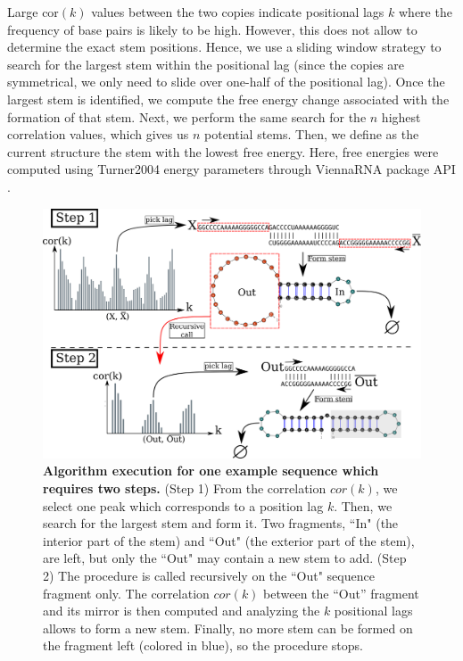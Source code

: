 Large \(\text{cor}(k)\) values between the two copies indicate positional lags \(k\) where the frequency of base pairs is likely to be high. However, this does not allow to determine the exact stem positions. Hence, we use a sliding window strategy to search for the largest stem within the positional lag (since the copies are symmetrical, we only need to slide over one-half of the positional lag). Once the largest stem is identified, we compute the free energy change associated with the formation of that stem. Next, we perform the same search for the \(n\) highest correlation values, which gives us \(n\) potential stems. Then, we define as the current structure the stem with the lowest free energy. Here, free energies were computed using Turner2004 energy parameters through ViennaRNA package API \cite{lorenz11_vienn_packag}.


\begin{figure}[t!]
	\centering
	\includegraphics[width=1.\linewidth]{../res/images/rafft/algo_draw.png}
	\caption{\label{algo_desc}\textbf{Algorithm execution for one example sequence which requires two steps.} (Step 1) From the correlation $cor(k)$, we select one peak which corresponds to a position lag $k$. Then, we search for the largest stem and form it. Two fragments, ``In" (the interior part of the stem) and ``Out" (the exterior part of the stem), are left, but only the ``Out" may contain a new stem to add. (Step 2) The procedure is called recursively on the ``Out" sequence fragment only. The correlation $cor(k)$ between the ``Out'' fragment and its mirror is then computed and analyzing the $k$ positional lags allows to form a new stem. Finally, no more stem can be formed on the fragment left (colored in blue), so the procedure stops.}
\end{figure}

